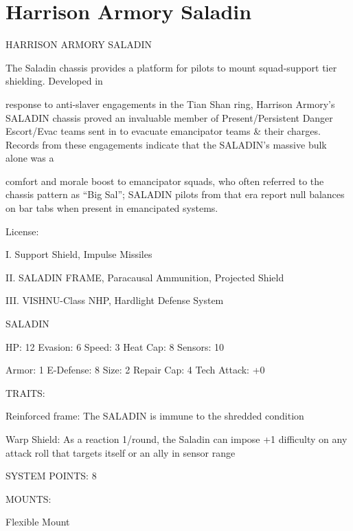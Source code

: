 \section{Harrison Armory Saladin}

                                HARRISON ARMORY SALADIN  

The Saladin chassis provides a platform for pilots to mount squad-support tier shielding. Developed in  

response to anti-slaver engagements in the Tian Shan ring, Harrison Armory’s SALADIN chassis proved an  
invaluable member of Present/Persistent Danger Escort/Evac teams sent in to evacuate emancipator teams  
\& their charges. Records from these engagements indicate that the SALADIN’s massive bulk alone was a  

comfort and morale boost to emancipator squads, who often referred to the chassis pattern as “Big Sal”;  
SALADIN pilots from that era report null balances on bar tabs when present in emancipated systems.   

                                                   License:
 
I. Support Shield, Impulse Missiles
 
II. SALADIN FRAME, Paracausal Ammunition, Projected Shield
 
III. VISHNU-Class NHP, Hardlight Defense System
 

                                                 SALADIN 

 HP: 12         Evasion: 6                            Speed: 3            Heat Cap: 8        Sensors: 10 

 Armor: 1       E-Defense: 8                          Size: 2             Repair Cap: 4      Tech Attack:  
                                                                                             +0 

                                                   TRAITS: 

 Reinforced frame: The SALADIN is immune to the shredded condition
 
 Warp Shield: As a reaction 1/round, the Saladin can impose +1 difficulty on any attack roll that targets  
 itself or an ally in sensor range  

                                             SYSTEM POINTS: 8 

                                                  MOUNTS: 

 Flexible Mount 

